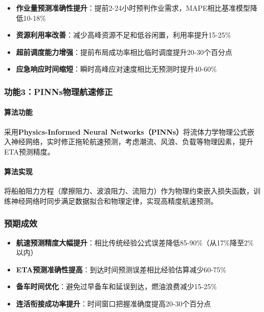 \documentclass[12pt,a4paper]{article}
\begin{document}
\begin{itemize}[leftmargin=*]
    \item[\checkmark] \textbf{作业量预测准确性提升}：提前2-24小时预判作业需求，MAPE相比基准模型降低10-18\%
    \item[\checkmark] \textbf{资源利用率改善}：减少高峰资源不足和低谷闲置，利用率提升15-25\%
    \item[\checkmark] \textbf{超前调度能力增强}：提前布局成功率相比临时调度提升20-30个百分点
    \item[\checkmark] \textbf{应急响应时间缩短}：瞬时高峰应对速度相比无预测时提升40-60\%
\end{itemize}

\subsubsection{功能3：PINNs物理航速修正}

\paragraph{算法功能}

采用\textbf{Physics-Informed Neural Networks（PINNs）}将流体力学物理公式嵌入神经网络，实时修正拖轮航速预测，考虑潮流、风浪、负载等物理因素，提升ETA预测精度。

\paragraph{算法实现}

将船舶阻力方程（摩擦阻力、波浪阻力、流阻力）作为物理约束嵌入损失函数，训练神经网络时同步满足数据拟合和物理定律，实现高精度航速预测。

\subsubsection{预期成效}

\begin{itemize}[leftmargin=*]
    \item[\checkmark] \textbf{航速预测精度大幅提升}：相比传统经验公式误差降低85-90\%（从17\%降至2\%以内）
    \item[\checkmark] \textbf{ETA预测准确性提高}：到达时间预测误差相比经验估算减少60-75\%
    \item[\checkmark] \textbf{备车时间优化}：避免过早备车和延误到达，燃油浪费减少15-25\%
    \item[\checkmark] \textbf{连活衔接成功率提升}：时间窗口把握准确度提高20-30个百分点
\end{itemize}
\end{document}
